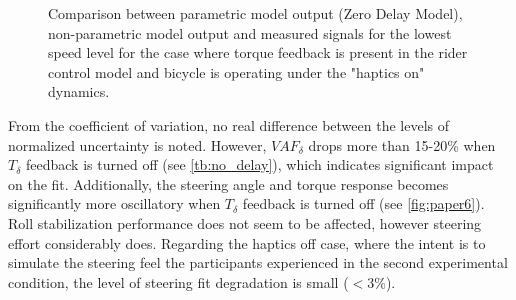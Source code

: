 
\begin{figure}[!h]
    \centering
        \centering
        \caption{Comparison between parametric model output (Zero Delay Model), non-parametric model output and measured signals for the lowest speed level for the case where torque feedback is present in the rider control model and bicycle is operating under the "haptics on" dynamics.}
    \label{fig:zdm_raw}
 \end{figure}


From the coefficient of variation, no real difference between the levels of normalized uncertainty is noted. However, \ensuremath{\mathit{VAF}_\delta} drops more than 15-20\% when \ensuremath{T_\delta} feedback is turned off (see \cref{tb:no_delay}), which indicates significant impact on the fit. Additionally,  the steering angle and torque response   becomes significantly more oscillatory when \ensuremath{{T_\delta}} feedback is turned off (see \cref{fig:paper6}). Roll stabilization performance does not seem to be affected, however steering effort considerably does. Regarding the haptics off case, where the intent is to simulate the steering feel the participants experienced in the second experimental condition, the level of steering fit degradation is small (\ensuremath{<3\%}).

